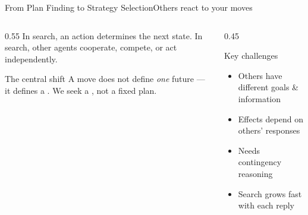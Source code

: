 \documentclass[aspectratio=169,11pt]{beamer}
\begin{document}
\begin{frame}{From Plan Finding to Strategy Selection}{Others react to your moves}
  \begin{columns}[T]
    \begin{column}{0.55\textwidth}
      In  search, an action determines the next state.
      In  search, other agents cooperate, compete, or act
      independently.
      \vspace{0.3em}
      \begin{alertblock}{The central shift}
        \small A move does not define \emph{one} future — it defines a
        . We seek a , not a
        fixed plan.
      \end{alertblock}
    \end{column}
    \begin{column}{0.45\textwidth}
      \begin{block}{Key challenges}
        \small
        \begin{itemize}
          \item Others have different goals \& information
          \item Effects depend on others' responses
          \item Needs contingency reasoning
          \item Search grows fast with each reply
        \end{itemize}
      \end{block}
    \end{column}
  \end{columns}
\end{frame}
\end{document}
